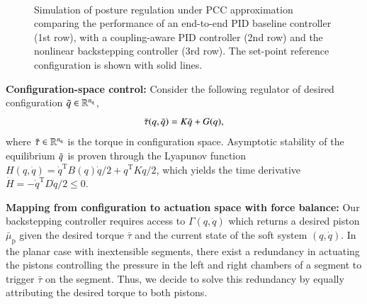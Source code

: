 \begin{figure}[ht]
  \\
  \caption{Simulation of posture regulation under \gls{PCC} approximation comparing the performance of an end-to-end PID baseline controller (1st row), with a coupling-aware PID controller (2nd row) and the nonlinear backstepping controller (3rd row). The set-point reference configuration is shown with solid lines.}
  \label{fig:backstepping:time_series_plots}
\end{figure}

\textbf{Configuration-space control:}
%
Consider the following regulator of desired configuration $\Bar{q} \in \mathbb{R}^{n_\mathrm{q}}$, 
%
\begin{equation}\label{eq:backstepping:high_level_regulation}
    \Bar{\tau}(q, \Bar{q}) = K \Bar{q} + G(q),
\end{equation}
%
where $\Bar{\tau} \in \mathbb{R}^{n_\mathrm{q}}$ is the torque in configuration space. %
%
Asymptotic stability of the equilibrium $\Bar{q}$ is proven through the Lyapunov function $H(q, \dot{q}) = \dot{q}^{\mathrm{T}} B(q) \dot{q}/2 + q^\mathrm{T} K q/2$, which yields the time derivative $\dot{H} = -\dot{q}^\mathrm{T} D \dot{q}/2 \leq 0$.

\textbf{Mapping from configuration to actuation space with force balance:}
Our backstepping controller requires access to $\Gamma(q,\dot{q})$ which returns a desired piston $\bar{\mu}_\mathrm{p}$ given the desired torque $\bar{\tau}$ and the current state of the soft system $(q,\dot{q})$. In the planar case with inextensible segments, there exist a redundancy in actuating the pistons controlling the pressure in the left and right chambers of a segment to trigger $\bar{\tau}$ on the segment. Thus, we decide to solve this redundancy by equally attributing the desired torque to both pistons.

